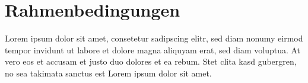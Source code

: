 \section{Rahmenbedingungen}\label{Rahmenbedingungen}

Lorem ipsum dolor sit amet, consetetur sadipscing elitr, sed diam nonumy eirmod tempor invidunt ut labore et dolore magna aliquyam erat, sed diam voluptua. At vero eos et accusam et justo duo dolores et ea rebum. Stet clita kasd gubergren, no sea takimata sanctus est Lorem ipsum dolor sit amet.





